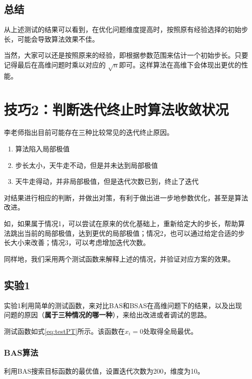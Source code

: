 \documentclass[]{ctexbook}
\providecommand{\tightlist}{%
  \setlength{\itemsep}{0pt}\setlength{\parskip}{0pt}}
\begin{document}
\subsection{总结}\label{-2}

从上述测试的结果可以看到，在优化问题维度提高时，按照原有经验选择的初始步长，可能会导致算法效果不佳。

当然，大家可以还是按照原来的经验，即根据参数范围来估计一个初始步长。只要记得最后在高维问题时乘以对应的
\(\sqrt{n}\)即可。这样算法在高维下会体现出更优的性能。

\section{技巧2：判断迭代终止时算法收敛状况}\label{2}

李老师指出目前可能存在三种比较常见的迭代终止原因。

\begin{enumerate}
\def\labelenumi{\arabic{enumi}.}
\tightlist
\item
  算法陷入局部极值
\item
  步长太小，天牛走不动，但是并未达到局部极值
\item
  天牛走得动，并非局部极值，但是迭代次数已到，终止了迭代
\end{enumerate}

对结果进行相应的判断，并做出对策，有利于做出进一步地参数优化，甚至是算法改进。

如，如果属于情况1，可以尝试在原来的优化基础上，重新给定大的步长，帮助算法跳出当前的局部极值，达到更优的局部极值；情况2，也可以通过给定合适的步长大小来改善；情况3，可以考虑增加迭代次数。

同样地，我们采用两个测试函数来解释上述的情况，并验证对应方案的效果。

\subsection{实验1}\label{1}

实验1利用简单的测试函数，来对比BAS和BSAS在高维问题下的结果，以及出现问题的原因（\textbf{属于三种情况的哪一种}），来给出改进或者调试的思路。

测试函数如式\eqref{eq:testPT}所示。该函数在\(x_i = 0\)处取得全局最优。

\subsubsection{BAS算法}\label{bas}

利用BAS搜索目标函数的最优值，设置迭代次数为200，维度为10。
\end{document}
